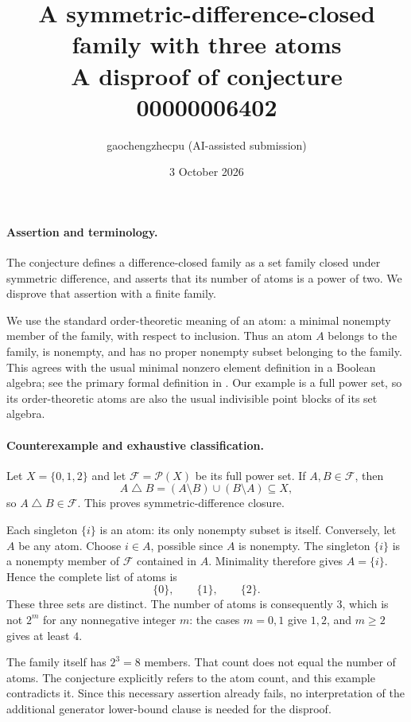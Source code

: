 \documentclass[11pt]{article}
\title{A symmetric-difference-closed family with three atoms\\A disproof of conjecture 00000006402}
\author{gaochengzhecpu (AI-assisted submission)}
\date{3 October 2026}
\begin{document}
\maketitle

\paragraph{Assertion and terminology.}
The conjecture defines a difference-closed family as a set family closed under symmetric difference, and asserts that its number of atoms is a power of two. We disprove that assertion with a finite family.

We use the standard order-theoretic meaning of an atom: a minimal nonempty member of the family, with respect to inclusion. Thus an atom $A$ belongs to the family, is nonempty, and has no proper nonempty subset belonging to the family. This agrees with the usual minimal nonzero element definition in a Boolean algebra; see the primary formal definition in \cite{atoms}. Our example is a full power set, so its order-theoretic atoms are also the usual indivisible point blocks of its set algebra.

\paragraph{Counterexample and exhaustive classification.}
Let $X=\{0,1,2\}$ and let $\mathcal F=\mathcal P(X)$ be its full power set. If $A,B\in\mathcal F$, then
\[
 A\mathbin{\triangle}B=(A\setminus B)\cup(B\setminus A)\subseteq X,
\]
so $A\mathbin{\triangle}B\in\mathcal F$. This proves symmetric-difference closure.

Each singleton $\{i\}$ is an atom: its only nonempty subset is itself. Conversely, let $A$ be any atom. Choose $i\in A$, possible since $A$ is nonempty. The singleton $\{i\}$ is a nonempty member of $\mathcal F$ contained in $A$. Minimality therefore gives $A=\{i\}$. Hence the complete list of atoms is
\[
 \{0\},\qquad\{1\},\qquad\{2\}.
\]
These three sets are distinct. The number of atoms is consequently $3$, which is not $2^m$ for any nonnegative integer $m$: the cases $m=0,1$ give $1,2$, and $m\ge2$ gives at least $4$.

The family itself has $2^3=8$ members. That count does not equal the number of atoms. The conjecture explicitly refers to the atom count, and this example contradicts it. Since this necessary assertion already fails, no interpretation of the additional generator lower-bound clause is needed for the disproof.
\end{document}
